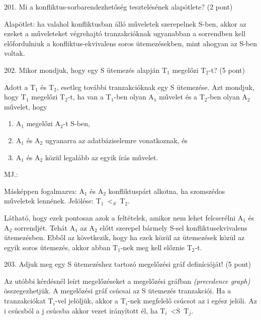 \documentclass[a4paper,11.5pt, table]{article}
\begin{document}
201. Mi a konfliktus-sorbarendezhetőség tesztelésének alapötlete? (2 pont)
	\begin{compactitem}
		\item Alapötlet: ha valahol konfliktusban álló műveletek szerepelnek S-ben, akkor az ezeket a műveleteket végrehajtó tranzakcióknak ugyanabban a sorrendben kell előfordulniuk a konfliktus-ekvivalens soros ütemezésekben, mint ahogyan az S-ben voltak.
	\end{compactitem}

202. Mikor mondjuk, hogy egy S ütemezés alapján T$ _{1} $ megelőzi T$ _{2} $-t? (5 pont)
	\begin{compactitem}
		\item Adott a T$ _{1} $ és T$ _{2} $, esetleg további tranzakcióknak egy S ütemezése. Azt mondjuk, hogy T$ _{1} $ megelőzi T$ _{2} $‑t, ha van a T$ _{1} $-ben olyan A$ _{1} $ művelet és a T$ _{2} $-ben olyan A$ _{2} $ művelet, hogy
		\begin{enumerate}
			\item A$ _{1} $ megelőzi A$ _{2} $-t S-ben,
			\item A$ _{1} $ és A$ _{2} $ ugyanarra az adatbáziselemre vonatkoznak, és
			\item A$ _{1} $ és A$ _{2} $ közül legalább az egyik írás művelet.
		\end{enumerate}
		\item MJ.:
		\begin{compactitem}
			\item Másképpen fogalmazva: A$ _{1} $ és A$ _{2} $ konfliktuspárt alkotna, ha szomszédos műveletek lennének. Jelölése: T$ _{1} $ <$ _{S} $ T$ _{2} $. 
			\item Látható, hogy ezek pontosan azok a feltételek, amikor nem lehet felcserélni A$ _{1} $ és A$ _{2} $ sorrendjét. Tehát A$ _{1} $ az A$ _{2} $ előtt szerepel bármely S-sel konfliktusekvivalens ütemezésben. Ebből az következik, hogy ha ezek közül az ütemezések közül az egyik soros ütemezés, akkor abban T$ _{1} $-nek meg kell előznie T$ _{2} $‑t.
		\end{compactitem}
	\end{compactitem}

203. Adjuk meg egy S ütemezéshez tartozó megelőzési gráf definícióját! (5 pont)
	\begin{compactitem}
		\item Az utóbbi kérdésnél leírt megelőzéseket a megelőzési gráfban \textit{(precedence graph)} összegezhetjük. A megelőzési gráf csúcsai az S ütemezés tranzakciói. Ha a tranzakciókat T$ _{i} $-vel jelöljük, akkor a T$ _{i} $-nek megfelelő csúcsot az i egész jelöli. Az i csúcsból a j csúcsba akkor vezet irányított él, ha T$ _{i} $ <S T$ _{j} $.
	\end{compactitem}
\end{document}
